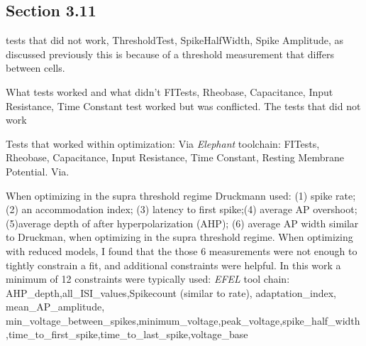 




\subsection{Section 3.11}
tests that did not work, ThresholdTest, SpikeHalfWidth, Spike Amplitude, as discussed previously this is because of a threshold measurement that differs between cells.


What tests worked and what didn't 
FITests, Rheobase, Capacitance, Input Resistance, Time Constant test worked but was conflicted. The tests that did not work 

Tests that worked within optimization:
Via \emph{Elephant} toolchain: FITests, Rheobase, Capacitance, Input Resistance, Time Constant, Resting Membrane Potential.
Via. 

When optimizing in the supra threshold regime Druckmann used:
(1) spike rate; (2) an accommodation index; (3) latency to first spike;(4) average AP overshoot; (5)average depth of after hyperpolarization (AHP); 
(6) average AP width similar to Druckman, when optimizing in the supra threshold regime.
When optimizing with reduced models, I found that the those 6 measurements were not enough to tightly constrain a fit, and additional constraints were helpful. In this work a minimum of 12 constraints were typically used:
\emph{EFEL} tool chain:
AHP_depth,all_ISI_values,Spikecount (similar to rate), adaptation_index,
mean_AP_amplitude, min_voltage_between_spikes,minimum_voltage,peak_voltage,spike_half_width
,time_to_first_spike,time_to_last_spike,voltage_base












%







